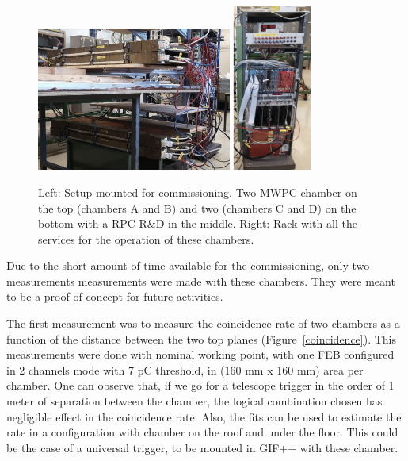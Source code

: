\begin{figure}[!htbp]
\begin{center}
\includegraphics[width=0.57\textwidth,keepaspectratio]{figures/rpc/mwpc/setup.png}\hspace*{1.cm}
\includegraphics[width=0.23\textwidth,keepaspectratio]{figures/rpc/mwpc/rack.png}\hspace*{1.cm}
\end{center}\vspace*{-.5cm}
\caption{Left: Setup mounted for commissioning. Two MWPC chamber on the top (chambers A and B) and two (chambers C and D) on the bottom with a RPC R\&D in the middle. Right: Rack with all the services for the operation of these chambers.}
\label{setup}
\end{figure}

Due to the short amount of time available for the commissioning, only two measurements measurements were made with these chambers. They were meant to be a proof of concept for future activities.

The first measurement was to measure the coincidence rate of two chambers as a function of the distance between the two top planes (Figure~\ref{coincidence}). This measurements were done with nominal working point, with one FEB configured in  2 channels mode with 7 pC threshold, in (160 mm x 160 mm) area per chamber. One can observe that, if we go for a telescope trigger in the order of 1 meter of separation between the chamber, the logical combination chosen has negligible effect in the coincidence rate. Also, the fits can be used to estimate the rate in a configuration with chamber on the roof and under the floor. This could be the case of a universal trigger, to be mounted in GIF++ with these chamber.

